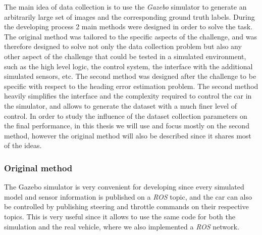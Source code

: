 \documentclass[a4paper,12pt,sort&compress]{article}
\begin{document}
The main idea of data collection is to use the \textit{Gazebo} simulator to generate an arbitrarily
large set of images and the corresponding ground truth labels. During the developing process 2 main
methods were designed in order to solve the task. The original method was tailored to the specific
aspects of the challenge, and was therefore designed to solve not only the data collection problem
but also any other aspect of the challenge that could be tested in a simulated environment, such as
the high level logic, the control system, the interface with the additional simulated sensors, etc.
The second method was designed after the challenge to be specific with respect to the heading error
estimation problem. The second method heavily simplifies the interface and the complexity required
to control the car in the simulator, and allows to generate the dataset with a much finer level of
control. In order to study the influence of the dataset collection parameters on the final
performance, in this thesis we will use and focus mostly on the second method, however the original
method will also be described since it shares most of the ideas.

\subsubsection*{Original method}
The Gazebo simulator is very convenient for developing since every simulated model and sensor
information is published on a \textit{ROS} topic, and the car can also be controlled by publishing
steering and throttle commands on their respective topics. This is very useful since it allows to
use the same code for both the simulation and the real vehicle, where we also implemented a
\textit{ROS} network. 
\end{document}
